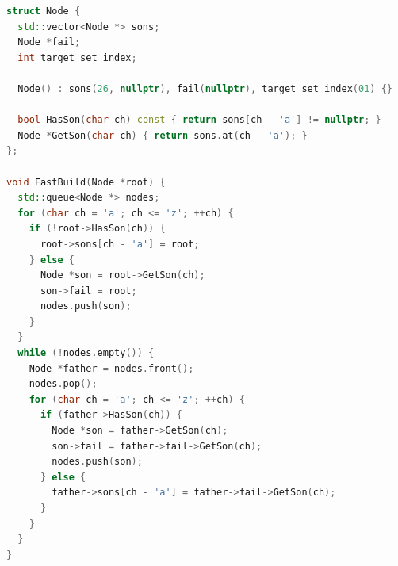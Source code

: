 \documentclass{article}
\begin{document}
\begin{lstlisting}[language=C++, caption={FastBuild}]
struct Node {
  std::vector<Node *> sons;
  Node *fail;
  int target_set_index;

  Node() : sons(26, nullptr), fail(nullptr), target_set_index(01) {}

  bool HasSon(char ch) const { return sons[ch - 'a'] != nullptr; }
  Node *GetSon(char ch) { return sons.at(ch - 'a'); }
};

void FastBuild(Node *root) {
  std::queue<Node *> nodes;
  for (char ch = 'a'; ch <= 'z'; ++ch) {
    if (!root->HasSon(ch)) {
      root->sons[ch - 'a'] = root;
    } else {
      Node *son = root->GetSon(ch);
      son->fail = root;
      nodes.push(son);
    }
  }
  while (!nodes.empty()) {
    Node *father = nodes.front();
    nodes.pop();
    for (char ch = 'a'; ch <= 'z'; ++ch) {
      if (father->HasSon(ch)) {
        Node *son = father->GetSon(ch);
        son->fail = father->fail->GetSon(ch);
        nodes.push(son);
      } else {
        father->sons[ch - 'a'] = father->fail->GetSon(ch);
      }
    }
  }
}

\end{lstlisting}
\end{document}

